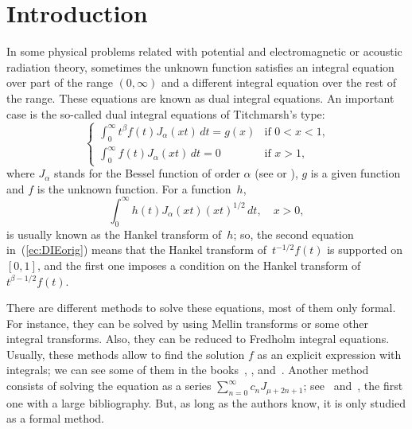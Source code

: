 \documentclass[12pt,leqno]{amsart}
\theoremstyle{plain}
\begin{document}
\section{Introduction}

In some physical problems related with potential and electromagnetic or
acoustic radiation theory, sometimes the unknown function satisfies an
integral equation over part of the range $(0,\infty)$ and a different integral
equation over the rest of the range. These equations are known as
dual integral equations. An important case is the so-called dual
integral equations of Titchmarsh's type:
\begin{equation}
    \label{ec:DIEorig}
    \left\{
      \begin{array}{ll}
      \displaystyle
      \int_0^\infty t^\beta f(t) J_\alpha(xt)\,dt = g(x)&
        \text{if $0<x<1$,} \\[8pt]
      \displaystyle
      \int_0^\infty f(t)J_\alpha(xt)\,dt = 0&
        \text{if $x>1$,}
      \end{array}
    \right.
\end{equation}
where $J_\alpha$ stands for the Bessel function of order $\alpha$ (see
\cite{Wat} or \cite[Ch.~VII]{E-HTF}), $g$ is a given function and $f$ is the
unknown function. For a function~$h$,
\begin{equation*}
    \int_0^\infty h(t)J_\alpha(xt) (xt)^{1/2} \,dt, \quad x > 0,
\end{equation*}
is usually known as the Hankel transform of~$h$; so, the second equation
in~(\ref{ec:DIEorig}) means that the Hankel transform of~$t^{-1/2} f(t)$ is
supported on $[0,1]$, and the first one imposes a condition on the Hankel
transform of~$t^{\beta-1/2} f(t)$.

There are different methods to solve these equations, most of them only formal. 
For instance, they can be solved by using Mellin transforms or some other
integral transforms. Also, they can be reduced to Fredholm integral equations.
Usually, these methods allow to find the solution $f$ as an explicit
expression with integrals; we can see some of them in the
books~\cite[p.~337]{Tit}, \cite[\S~12, p.~65]{Sne}, \cite[\S~5.11]{Hoc}
and~\cite[p.~76]{E-HTF}. Another method consists of solving the equation as a
series $\sum_{n=0}^\infty c_n J_{\mu+2n+1}$; see~\cite{Tra1} and~\cite{Tra2},
the first one with a large bibliography. But, as long as the authors know, it
is only studied as a formal method.
\end{document}
